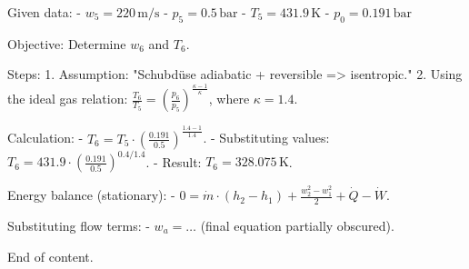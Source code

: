 Given data:  
- \( w_5 = 220 \, \text{m/s} \)  
- \( p_5 = 0.5 \, \text{bar} \)  
- \( T_5 = 431.9 \, \text{K} \)  
- \( p_0 = 0.191 \, \text{bar} \)  

Objective: Determine \( w_6 \) and \( T_6 \).  

Steps:  
1. Assumption: "Schubdüse adiabatic + reversible => isentropic."  
2. Using the ideal gas relation:  
   \( \frac{T_6}{T_5} = \left( \frac{p_6}{p_5} \right)^{\frac{\kappa - 1}{\kappa}} \), where \( \kappa = 1.4 \).  

Calculation:  
- \( T_6 = T_5 \cdot \left( \frac{0.191}{0.5} \right)^{\frac{1.4 - 1}{1.4}} \).  
- Substituting values:  
  \( T_6 = 431.9 \cdot \left( \frac{0.191}{0.5} \right)^{0.4 / 1.4} \).  
- Result: \( T_6 = 328.075 \, \text{K} \).  

Energy balance (stationary):  
- \( 0 = \dot{m} \cdot (h_2 - h_1) + \frac{w_2^2 - w_1^2}{2} + \dot{Q} - \dot{W} \).  

Substituting flow terms:  
- \( w_a = \dots \) (final equation partially obscured).  

End of content.